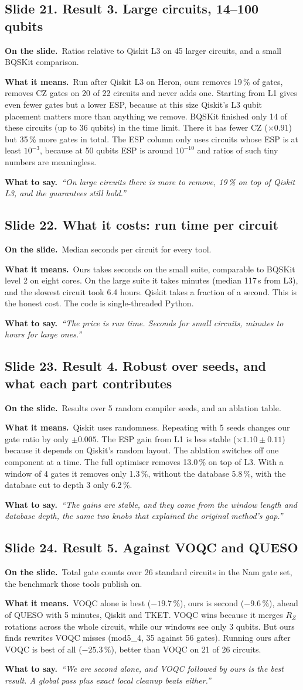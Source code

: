 \documentclass[11pt,a4paper]{article}
\newcommand{\say}[1]{\emph{``#1''}}
\newcommand{\slide}[2]{\subsection*{Slide #1. #2}}
\newcommand{\shows}{\par\textbf{\color{ibar}On the slide.}\ }
\newcommand{\means}{\par\textbf{\color{ibar}What it means.}\ }
\newcommand{\tosay}{\par\textbf{\color{ibar}What to say.}\ }
\begin{document}
\slide{21}{Result 3. Large circuits, 14--100 qubits}
\shows Ratios relative to Qiskit L3 on 45 larger circuits, and a small BQSKit comparison.
\means Run after Qiskit L3 on Heron, ours removes 19\,\% of gates, removes CZ gates on 20 of 22 circuits and never adds one.
Starting from L1 gives even fewer gates but a lower ESP, because at this size Qiskit's L3 qubit placement matters more than
anything we remove. BQSKit finished only 14 of these circuits (up to 36 qubits) in the time limit. There it has fewer CZ
($\times0.91$) but 35\,\% more gates in total. The ESP column only uses circuits whose ESP is at least $10^{-3}$, because
at 50 qubits ESP is around $10^{-10}$ and ratios of such tiny numbers are meaningless.
\tosay \say{On large circuits there is more to remove, 19\,\% on top of Qiskit L3, and the guarantees still hold.}

\slide{22}{What it costs: run time per circuit}
\shows Median seconds per circuit for every tool.
\means Ours takes seconds on the small suite, comparable to BQSKit level 2 on eight cores. On the large suite it takes
minutes (median 117\,s from L3), and the slowest circuit took 6.4 hours. Qiskit takes a fraction of a second. This is the
honest cost. The code is single-threaded Python.
\tosay \say{The price is run time. Seconds for small circuits, minutes to hours for large ones.}

\slide{23}{Result 4. Robust over seeds, and what each part contributes}
\shows Results over 5 random compiler seeds, and an ablation table.
\means Qiskit uses randomness. Repeating with 5 seeds changes our gate ratio by only $\pm0.005$. The ESP gain from L1 is
less stable ($\times1.10\pm0.11$) because it depends on Qiskit's random layout. The ablation switches off one component
at a time. The full optimiser removes 13.0\,\% on top of L3. With a window of 4 gates it removes only 1.3\,\%, without the
database 5.8\,\%, with the database cut to depth 3 only 6.2\,\%.
\tosay \say{The gains are stable, and they come from the window length and database depth, the same two knobs that explained
the original method's gap.}

\slide{24}{Result 5. Against VOQC and QUESO}
\shows Total gate counts over 26 standard circuits in the Nam gate set, the benchmark those tools publish on.
\means VOQC alone is best ($-19.7\,\%$), ours is second ($-9.6\,\%$), ahead of QUESO with 5 minutes, Qiskit and TKET. VOQC
wins because it merges $R_Z$ rotations across the whole circuit, while our windows see only 3 qubits. But ours finds
rewrites VOQC misses (mod5\_4, 35 against 56 gates). Running ours after VOQC is best of all ($-25.3\,\%$), better than VOQC
on 21 of 26 circuits.
\tosay \say{We are second alone, and VOQC followed by ours is the best result. A global pass plus exact local cleanup beats
either.}
\end{document}
